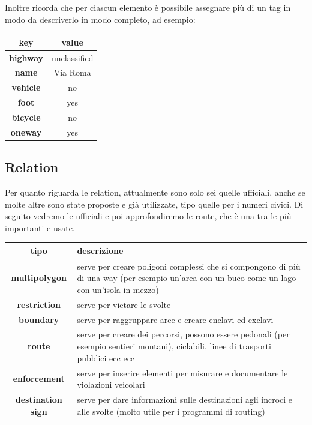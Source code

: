 \documentclass[a4paper,twoside,12pt,]{article}
\newcommand{\key}[1]{\textsf{\textbf{#1}}}
\newcommand{\val}[1]{\textsf{#1}}
\begin{document}
Inoltre ricorda che per ciascun elemento è possibile assegnare più di un tag in modo da descriverlo in modo completo, ad esempio:
\begin{center}
 \begin{tabular}{cc}
  \toprule
   \textbf{key} & \textbf{value} \\
  \midrule
   \key{highway} & \val{unclassified} \\
   \key{name} & \val{Via Roma} \\
   \key{vehicle} & \val{no} \\
   \key{foot} & \val{yes} \\
   \key{bicycle} & \val{no} \\
   \key{oneway} & \val{yes} \\
  \bottomrule
 \end{tabular}
\end{center}

\subsection{Relation}
Per quanto riguarda le relation, attualmente sono solo sei quelle ufficiali, anche se molte altre sono state proposte e già utilizzate, tipo quelle per i numeri civici. Di seguito vedremo le ufficiali e poi approfondiremo le route, che è una tra le più importanti e usate.
\begin{center}
 \begin{tabular}{c p{9cm}}
  \toprule
   \textbf{tipo} & \textbf{descrizione} \\
  \midrule
   \key{multipolygon} & serve per creare poligoni complessi che si compongono di più di una way (per esempio un'area con un buco come un lago con un'isola in mezzo) \\
   \key{restriction}	& serve per vietare le svolte \\
   \key{boundary}	& serve per raggruppare aree e creare enclavi ed exclavi \\
   \key{route} & serve per creare dei percorsi, possono essere pedonali (per esempio sentieri montani), ciclabili, linee di trasporti pubblici ecc ecc \\
   \key{enforcement} & serve per inserire elementi per misurare e documentare le violazioni veicolari \\
   \key{destination sign} & serve per dare informazioni sulle destinazioni agli incroci e alle svolte (molto utile per i programmi di routing) \\
  \bottomrule
\end{tabular}
\end{center}
\end{document}
